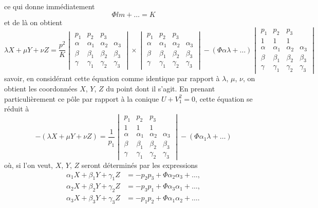 \documentclass[11pt,a4paper]{book}
\begin{document}
ce qui donne imm\'{e}diatement
\[
\Phi lm + \ldots = K
\]
et de l\`{a} on obtient
\[
\lambda X + \mu Y + \nu Z = \frac{p^2}{K}
\begin{vmatrix}
p_1 & p_2 & p_3 \\
\alpha & \alpha_1 & \alpha_2 & \alpha_3 \\
\beta & \beta_1 & \beta_2 & \beta_3 \\
\gamma & \gamma_1 & \gamma_2 & \gamma_3
\end{vmatrix}
\times
\begin{vmatrix}
p_1 & p_2 & p_3 \\
\alpha & \alpha_1 & \alpha_2 & \alpha_3 \\
\beta & \beta_1 & \beta_2 & \beta_3 \\
\gamma & \gamma_1 & \gamma_2 & \gamma_3
\end{vmatrix}
- (\Phi \alpha \lambda + \ldots)
\begin{vmatrix}
p_1 & p_2 & p_3 \\
1 & 1 & 1 \\
\alpha & \alpha_1 & \alpha_2 & \alpha_3 \\
\beta & \beta_1 & \beta_2 & \beta_3 \\
\gamma & \gamma_1 & \gamma_2 & \gamma_3
\end{vmatrix}
\]
savoir, en consid\'{e}rant cette \'{e}quation comme identique par rapport \`{a} $\lambda$, $\mu$, $\nu$, on obtient les coordonn\'{e}es $X$, $Y$, $Z$ du point dont il s'agit. En prenant particuli\`{e}rement ce p\^{o}le par rapport \`{a} la conique $U + V_1^2 = 0$, cette \'{e}quation se r\'{e}duit \`{a}
\[
-(\lambda X + \mu Y + \nu Z) = \frac{1}{p_1}
\begin{vmatrix}
p_1 & p_2 & p_3 \\
1 & 1 & 1 \\
\alpha & \alpha_1 & \alpha_2 & \alpha_3 \\
\beta & \beta_1 & \beta_2 & \beta_3 \\
\gamma & \gamma_1 & \gamma_2 & \gamma_3
\end{vmatrix}
-(\Phi \alpha_1 \lambda + \ldots)
\]
o\`{u}, si l'on veut, $X$, $Y$, $Z$ seront d\'{e}termin\'{e}s par les expressions
\begin{align}
\tag{8} \alpha_1 X + \beta_1 Y + \gamma_1 Z &= -p_2 p_3 + \Phi \alpha_2 \alpha_3 + \ldots, \\
\tag{9} \alpha_2 X + \beta_2 Y + \gamma_2 Z &= -p_3 p_1 + \Phi \alpha_3 \alpha_1 + \ldots, \\
\alpha_3 X + \beta_3 Y + \gamma_3 Z &= -p_1 p_2 + \Phi \alpha_1 \alpha_2 + \ldots.
\end{align}
\end{document}

